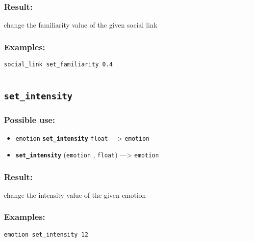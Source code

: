 \documentclass[]{book}
\providecommand{\tightlist}{%
  \setlength{\itemsep}{0pt}\setlength{\parskip}{0pt}}
\theoremstyle{definition}
\theoremstyle{definition}
\theoremstyle{definition}
\theoremstyle{remark}
\begin{document}
\subsubsection{Result:}\label{result-443}

change the familiarity value of the given social link

\subsubsection{Examples:}\label{examples-316}

\begin{verbatim}
social_link set_familiarity 0.4 
\end{verbatim}

\begin{center}\rule{0.5\linewidth}{\linethickness}\end{center}

\subsection{\texorpdfstring{\texttt{set\_intensity}}{set\_intensity}}\label{set_intensity}

\subsubsection{Possible use:}\label{possible-use-460}

\begin{itemize}
\tightlist
\item
  \texttt{emotion} \textbf{\texttt{set\_intensity}} \texttt{float}
  ---\textgreater{} \texttt{emotion}
\item
  \textbf{\texttt{set\_intensity}} (\texttt{emotion} , \texttt{float})
  ---\textgreater{} \texttt{emotion}
\end{itemize}

\subsubsection{Result:}\label{result-444}

change the intensity value of the given emotion

\subsubsection{Examples:}\label{examples-317}

\begin{verbatim}
emotion set_intensity 12 
\end{verbatim}
\end{document}
